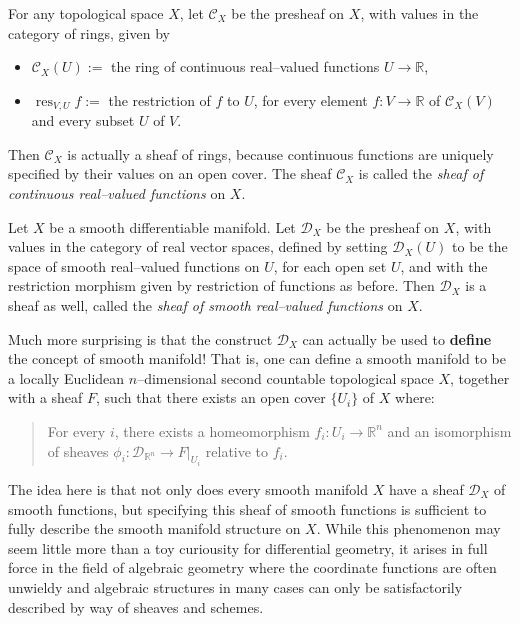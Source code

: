 \documentclass[12pt]{article}
\newcommand{\R}{\mathbb{R}}
\renewcommand{\c}{\mathcal{C}}
\newcommand{\D}{\mathcal{D}}
\newcommand{\res}{\operatorname{res}}
\begin{document}
\begin{example}
For any topological space $X$, let $\c_X$ be the presheaf on $X$, with
values in the category of rings, given by
\begin{itemize}
\item $\c_X(U) := $ the ring of continuous real--valued functions $U
\to \R$,
\item $\res_{V,U} f := $ the restriction of $f$ to $U$, for every
element $f\colon V \to \R$ of $\c_X(V)$ and every subset $U$ of $V$.
\end{itemize}
Then $\c_X$ is actually a sheaf of rings, because continuous functions
are uniquely specified by their values on an open cover. The sheaf
$\c_X$ is called the \emph{sheaf of continuous real--valued functions}
on $X$.
\end{example}

\begin{example}
Let $X$ be a smooth differentiable manifold. Let $\D_X$ be the
presheaf on $X$, with values in the category of real vector spaces,
defined by setting $\D_X(U)$ to be the space of smooth real--valued
functions on $U$, for each open set $U$, and with the restriction
morphism given by restriction of functions as before. Then $\D_X$ is a
sheaf as well, called the \emph{sheaf of smooth real--valued functions}
on $X$.

Much more surprising is that the construct $\D_X$ can actually be used
to {\bf define} the concept of smooth manifold! That is, one can
define a smooth manifold to be a locally Euclidean $n$--dimensional
second countable topological space $X$, together with a sheaf $F$,
such that there exists an open cover $\{U_i\}$ of $X$ where:
\begin{quotation}
For every $i$, there exists a homeomorphism $f_i\colon U_i \to \R^n$ and
an isomorphism of sheaves $\phi_i\colon \D_{\R^n} \to F|_{U_i}$ relative
to $f_i$.
\end{quotation}
The idea here is that not only does every smooth manifold $X$ have a
sheaf $\D_X$ of smooth functions, but specifying this sheaf of smooth
functions is sufficient to fully describe the smooth manifold
structure on $X$. While this phenomenon may seem little more than a
toy curiousity for differential geometry, it arises in full force in
the field of algebraic geometry where the coordinate functions are
often unwieldy and algebraic structures in many cases can only be
satisfactorily described by way of sheaves and schemes.
\end{example}
\end{document}
